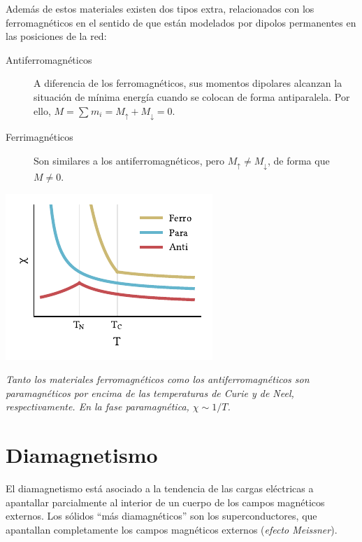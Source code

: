 \documentclass{tufte-book}
\newcommand{\sub}[1]{_{{\scriptscriptstyle\mathit{#1}}}}
\begin{document}
Además de estos materiales existen dos tipos extra, relacionados con
los ferromagnéticos en el sentido de que están modelados por dipolos
permanentes en las posiciones de la red:

\begin{description}

\item[Antiferromagnéticos]
A diferencia de los ferromagnéticos, sus momentos dipolares alcanzan
la situación de mínima energía cuando se colocan de forma
antiparalela. Por ello, $M = \sum_{}m_i = M\sub{↑} + M\sub{↓} = 0$.

\item[Ferrimagnéticos]
  Son similares a los antiferromagnéticos, pero $M\sub{↑} ≠ M\sub{↓}$,
  de forma que $M ≠ 0$.

\end{description}

\begin{marginfigure}
  \centering
  \includegraphics[width=\textwidth]{figures/chicomp.pdf}
  \caption{\itshape Tanto los materiales ferromagnéticos como los
    antiferromagnéticos son paramagnéticos por encima de las
    temperaturas de Curie y de Neel, respectivamente. En la fase
    paramagnética, $χ∼1/T$.}
  \label{fig:susc_comp}
\end{marginfigure}


\section{Diamagnetismo}
El diamagnetismo está asociado a la tendencia de las cargas eléctricas
a apantallar parcialmente al interior de un cuerpo de los campos
magnéticos externos. Los sólidos ``más diamagnéticos'' son los
superconductores, que apantallan completamente los campos magnéticos
externos (\emph{efecto Meissner}).
\end{document}
